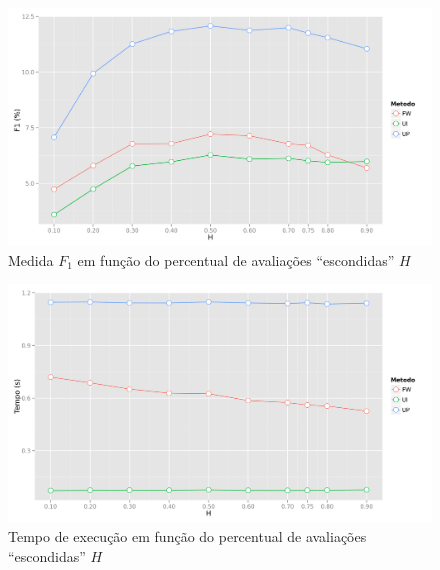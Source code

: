 {\begin{figure}[hp]
    \begin{center}
    \includegraphics[width=1\textwidth]{img/F1_H}
    \end{center}
    \caption{Medida $F_1$ em função do percentual de avaliações ``escondidas'' $H$}
    \label{fig:F1_H}
\end{figure}

\begin{figure}[hp]
    \begin{center}
    \includegraphics[width=1\textwidth]{img/time_H}
    \end{center}
    \caption{Tempo de execução em função do percentual de avaliações ``escondidas'' $H$}
    \label{fig:time_H}
\end{figure}


}
